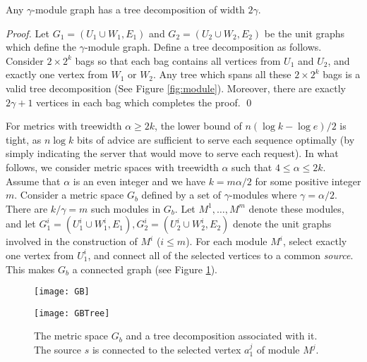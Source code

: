 \begin{lemma} \label{mytd}
 Any $\gamma$-module graph has a tree decomposition of width $2\gamma$.
\end{lemma}

\begin{proof}
Let $G_1=(U_1 \cup  W_1, E_1)$ and $G_2=(U_2 \cup  W_2, E_2)$ be the unit graphs which define the $\gamma$-module graph. 
Define a tree decomposition as follows. Consider $2 \times 2^k$ bags so that each bag contains all vertices from $U_1$ and  $U_2$, and exactly one vertex from $W_1$ or $W_2$. Any tree which spans all these $2 \times 2^k$ bags is a valid tree decomposition (See Figure \ref{fig:module}). Moreover, there are exactly $2\gamma+1$ vertices in each bag which completes the proof.
\qed 
\end{proof}

For metrics with treewidth $\alpha \geq 2k$, the lower bound of $n (\log k-\log e)/2$ is tight, as $n \log k$ bits of advice are sufficient to serve each sequence optimally (by simply indicating the server that \opt would move to serve each request). In what follows, we consider metric spaces with treewidth $\alpha$ such that $4 \leq \alpha \leq 2k$. Assume that $\alpha$ is an even integer and we have $k = m \alpha /2$ for some positive integer $m$. 
Consider a metric space $G_{b}$ defined by a set of $\gamma$-modules where $\gamma = \alpha /2$. There are $k/ \gamma = m$ such modules in $G_b$. Let $M^1 , \ldots, M^{m}$ denote these modules, and let $G_1^i= (U_1^i\cup W_1^i, E_1), G_2^i= (U_2^i\cup W_2^i,E_2)$ denote the unit graphs involved in the construction of $M^i$ ($i \leq m$). For each module $M^i$, select exactly one vertex from $U_1^i$, and connect all of the selected vertices to a common \textit{source}. This makes $G_b$ a connected graph (see Figure \ref{fig:GB}).

\begin{figure}[t]
\begin{minipage}{0.5 \linewidth}
\centering
\texttt{[image: GB]}
\label{fig:figure1}
\end{minipage}
\begin{minipage}{0.5\linewidth}
\centering
\texttt{[image: GBTree]}
\label{fig:figure2}
\end{minipage}
\caption{The metric space $G_b$ and a tree decomposition associated with it. The source $s$ is connected to the selected vertex $a^j_1$ of module $M^j$. \label{fig:GB}}
\end{figure}


